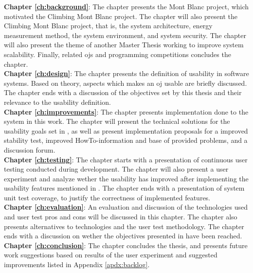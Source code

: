 \textbf{Chapter \ref{ch:background}}: The chapter presents the Mont Blanc project, which motivated the Climbing Mont Blanc project. The chapter will also present the Climbing Mont Blanc project, that is, the system architecture, energy measurement method, the system environment, and system security. The chapter will also present the theme of another Master Thesis working to improve system scalability. Finally, related \glspl{oj} and programming competitions concludes the chapter. \\

\textbf{Chapter \ref{ch:design}}: The chapter presents the definition of usability in software systems. Based on theory, aspects which makes an \gls{oj} usable are briefly discussed. The chapter ends with a discussion of the objectives set by this thesis and their relevance to the usability definition. \\

\textbf{Chapter \ref{ch:improvements}}: The chapter presents implementation done to the system in this work. The chapter will present the technical solutions for the usability goals set in , as well as present implementation proposals for a improved stability test, improved HowTo-information and base of provided problems, and a discussion forum. \\

\textbf{Chapter \ref{ch:testing}}: The chapter starts with a presentation of continuous user testing conducted during development. The chapter will also present a user experiment and analyze wether the usability has improved after implementing the usability features mentioned in . The chapter ends with a presentation of system unit test coverage, to justify the correctness of implemented features. \\

\textbf{Chapter \ref{ch:evaluation}}: An evaluation and discussion of the technologies used and user test pros and cons will be discussed in this chapter. The chapter also presents alternatives to technologies and the user test methodology. The chapter ends with a discussion on wether the objectives presented in  have been reached. \\

\textbf{Chapter \ref{ch:conclusion}}: The chapter concludes the thesis, and presents future work suggestions based on results of the user experiment and suggested improvements listed in Appendix \ref{apdx:backlog}.



